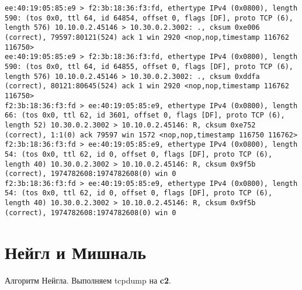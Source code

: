 \documentclass[a4paper,12pt]{article}
\begin{document}
\begin{Verbatim}
ee:40:19:05:85:e9 > f2:3b:18:36:f3:fd, ethertype IPv4 (0x0800), length 590: (tos 0x0, ttl 64, id 64854, offset 0, flags [DF], proto TCP (6), length 576) 10.10.0.2.45146 > 10.30.0.2.3002: ., cksum 0xe006 (correct), 79597:80121(524) ack 1 win 2920 <nop,nop,timestamp 116762 116750>
ee:40:19:05:85:e9 > f2:3b:18:36:f3:fd, ethertype IPv4 (0x0800), length 590: (tos 0x0, ttl 64, id 64855, offset 0, flags [DF], proto TCP (6), length 576) 10.10.0.2.45146 > 10.30.0.2.3002: ., cksum 0xddfa (correct), 80121:80645(524) ack 1 win 2920 <nop,nop,timestamp 116762 116750>
f2:3b:18:36:f3:fd > ee:40:19:05:85:e9, ethertype IPv4 (0x0800), length 66: (tos 0x0, ttl 62, id 3601, offset 0, flags [DF], proto TCP (6), length 52) 10.30.0.2.3002 > 10.10.0.2.45146: R, cksum 0xe752 (correct), 1:1(0) ack 79597 win 1572 <nop,nop,timestamp 116750 116762>
f2:3b:18:36:f3:fd > ee:40:19:05:85:e9, ethertype IPv4 (0x0800), length 54: (tos 0x0, ttl 62, id 0, offset 0, flags [DF], proto TCP (6), length 40) 10.30.0.2.3002 > 10.10.0.2.45146: R, cksum 0x9f5b (correct), 1974782608:1974782608(0) win 0
f2:3b:18:36:f3:fd > ee:40:19:05:85:e9, ethertype IPv4 (0x0800), length 54: (tos 0x0, ttl 62, id 0, offset 0, flags [DF], proto TCP (6), length 40) 10.30.0.2.3002 > 10.10.0.2.45146: R, cksum 0x9f5b (correct), 1974782608:1974782608(0) win 0
\end{Verbatim}

\section{Нейгл и Мишналь}

Алгоритм Нейгла. Выполняем tcpdump на \textbf{c2}.
\end{document}
